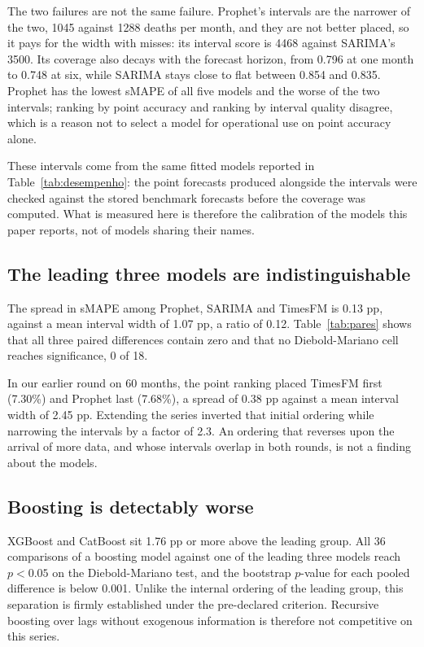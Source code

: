 The two failures are not the same failure. Prophet's intervals are the narrower of the two,
1045 against 1288 deaths per month, and they are not better placed, so it pays for the width
with misses: its interval score is 4468 against SARIMA's 3500. Its coverage also decays with
the forecast horizon, from 0.796 at one month to 0.748 at six, while SARIMA stays close to
flat between 0.854 and 0.835. Prophet has the lowest sMAPE of all five models and the worse
of the two intervals; ranking by point accuracy and ranking by interval quality disagree,
which is a reason not to select a model for operational use on point accuracy alone.

These intervals come from the same fitted models reported in
Table~\ref{tab:desempenho}: the point forecasts produced alongside the intervals were checked
against the stored benchmark forecasts before the coverage was computed. What is measured
here is therefore the calibration of the models this paper reports, not of models sharing
their names.

\subsection{The leading three models are indistinguishable}

The spread in sMAPE among Prophet, SARIMA and TimesFM is 0.13 pp, against a mean interval
width of 1.07 pp, a ratio of 0.12. Table~\ref{tab:pares} shows that all three paired
differences contain zero and that no Diebold-Mariano cell reaches significance, 0 of 18.



In our earlier round on 60 months, the point ranking placed TimesFM first (7.30\%) and
Prophet last (7.68\%), a spread of 0.38 pp against a mean interval width of 2.45 pp.
Extending the series inverted that initial ordering while narrowing the intervals by a
factor of 2.3. An ordering that reverses upon the arrival of more data, and whose intervals
overlap in both rounds, is not a finding about the models.

\subsection{Boosting is detectably worse}

XGBoost and CatBoost sit 1.76 pp or more above the leading group. All 36 comparisons of a
boosting model against one of the leading three models reach $p<0.05$ on the
Diebold-Mariano test, and the bootstrap $p$-value for each pooled difference is below 0.001.
Unlike the internal ordering of the leading group, this separation is firmly established
under the pre-declared criterion. Recursive boosting over lags without exogenous information
is therefore not competitive on this series.

